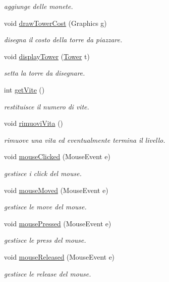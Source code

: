 \begin{DoxyCompactItemize}
\begin{DoxyCompactList}\small\item\em aggiunge delle monete. \end{DoxyCompactList}\item 
void \hyperlink{classui_1_1_action_bar_a32afe6a393c6361d391e26ed96971131}{draw\+Tower\+Cost} (Graphics g)
\begin{DoxyCompactList}\small\item\em disegna il costo della torre da piazzare. \end{DoxyCompactList}\item 
void \hyperlink{classui_1_1_action_bar_aacab7287bc123d863feb4551df131934}{display\+Tower} (\hyperlink{classtowers_1_1_tower}{Tower} t)
\begin{DoxyCompactList}\small\item\em setta la torre da disegnare. \end{DoxyCompactList}\item 
int \hyperlink{classui_1_1_action_bar_a3de978b9745ea5fdbe99d556e40166f6}{get\+Vite} ()
\begin{DoxyCompactList}\small\item\em restituisce il numero di vite. \end{DoxyCompactList}\item 
void \hyperlink{classui_1_1_action_bar_a484775c889ccd8602b66ad795b141534}{rimuovi\+Vita} ()
\begin{DoxyCompactList}\small\item\em rimuove una vita ed eventualmente termina il livello. \end{DoxyCompactList}\item 
void \hyperlink{classui_1_1_action_bar_a45d56bd84238e8b56589dfc732e2b2cf}{mouse\+Clicked} (Mouse\+Event e)
\begin{DoxyCompactList}\small\item\em gestisce i click del mouse. \end{DoxyCompactList}\item 
void \hyperlink{classui_1_1_action_bar_a2ca251710b65639ec80bc141edde60aa}{mouse\+Moved} (Mouse\+Event e)
\begin{DoxyCompactList}\small\item\em gestisce le move del mouse. \end{DoxyCompactList}\item 
void \hyperlink{classui_1_1_action_bar_aed82e1ce3dd3cf283d508c3ba3be70ef}{mouse\+Pressed} (Mouse\+Event e)
\begin{DoxyCompactList}\small\item\em gestisce le press del mouse. \end{DoxyCompactList}\item 
void \hyperlink{classui_1_1_action_bar_a87a07291794e15052db67f945d90853e}{mouse\+Released} (Mouse\+Event e)
\begin{DoxyCompactList}\small\item\em gestisce le release del mouse. \end{DoxyCompactList}\end{DoxyCompactItemize}
